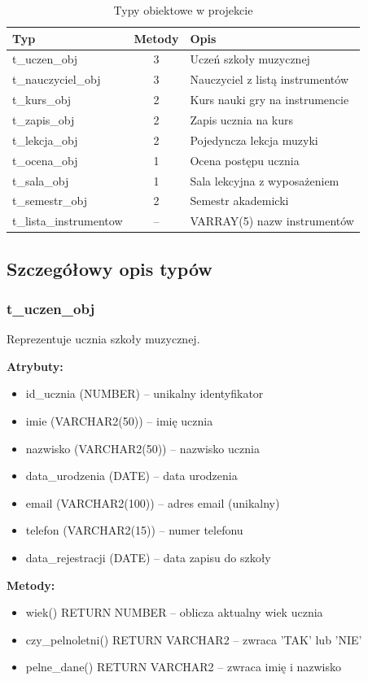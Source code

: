 \documentclass[12pt,a4paper]{article}
\begin{document}
\begin{table}[h]
\centering
\begin{tabular}{|l|c|p{6cm}|}
\hline
\textbf{Typ} & \textbf{Metody} & \textbf{Opis} \\
\hline
t\_uczen\_obj & 3 & Uczeń szkoły muzycznej \\
t\_nauczyciel\_obj & 3 & Nauczyciel z listą instrumentów \\
t\_kurs\_obj & 2 & Kurs nauki gry na instrumencie \\
t\_zapis\_obj & 2 & Zapis ucznia na kurs \\
t\_lekcja\_obj & 2 & Pojedyncza lekcja muzyki \\
t\_ocena\_obj & 1 & Ocena postępu ucznia \\
t\_sala\_obj & 1 & Sala lekcyjna z wyposażeniem \\
t\_semestr\_obj & 2 & Semestr akademicki \\
t\_lista\_instrumentow & -- & VARRAY(5) nazw instrumentów \\
\hline
\end{tabular}
\caption{Typy obiektowe w projekcie}
\end{table}

\subsection{Szczegółowy opis typów}

\subsubsection{t\_uczen\_obj}
Reprezentuje ucznia szkoły muzycznej.

\textbf{Atrybuty:}
\begin{itemize}[nosep]
    \item id\_ucznia (NUMBER) -- unikalny identyfikator
    \item imie (VARCHAR2(50)) -- imię ucznia
    \item nazwisko (VARCHAR2(50)) -- nazwisko ucznia
    \item data\_urodzenia (DATE) -- data urodzenia
    \item email (VARCHAR2(100)) -- adres email (unikalny)
    \item telefon (VARCHAR2(15)) -- numer telefonu
    \item data\_rejestracji (DATE) -- data zapisu do szkoły
\end{itemize}

\textbf{Metody:}
\begin{itemize}[nosep]
    \item wiek() RETURN NUMBER -- oblicza aktualny wiek ucznia
    \item czy\_pelnoletni() RETURN VARCHAR2 -- zwraca 'TAK' lub 'NIE'
    \item pelne\_dane() RETURN VARCHAR2 -- zwraca imię i nazwisko
\end{itemize}
\end{document}

